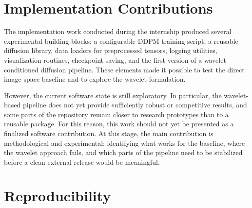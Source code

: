 


\section{Implementation Contributions}

The implementation work conducted during the internship produced several
experimental building blocks: a configurable DDPM training script, a reusable
diffusion library, data loaders for preprocessed tensors, logging utilities,
visualization routines, checkpoint saving, and the first version of a
wavelet-conditioned diffusion pipeline. These elements made it possible to
test the direct image-space baseline and to explore the wavelet formulation.

However, the current software state is still exploratory. In particular, the
wavelet-based pipeline does not yet provide sufficiently robust or competitive
results, and some parts of the repository remain closer to research prototypes
than to a reusable package. For this reason, this work should not yet be
presented as a finalized software contribution. At this stage, the main
contribution is methodological and experimental: identifying what works for the
baseline, where the wavelet approach fails, and which parts of the pipeline
need to be stabilized before a clean external release would be meaningful.

\section{Reproducibility}

